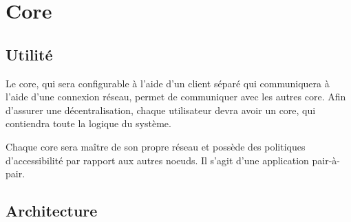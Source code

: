 ﻿\section{Core}
\subsection{Utilité}
Le core, qui sera configurable à l'aide d'un client séparé qui communiquera
à l'aide d'une connexion réseau, permet de communiquer avec les autres core.
Afin d'assurer une décentralisation, chaque utilisateur devra avoir un core,
qui contiendra toute la logique du système.

Chaque core sera maître de son propre réseau et possède des politiques d'accessibilité
par rapport aux autres noeuds. Il s'agit d'une application pair-à-pair.

\subsection{Architecture}
